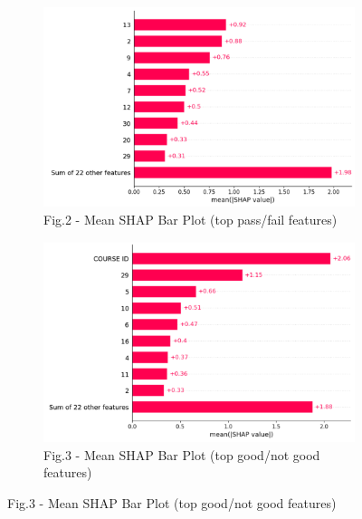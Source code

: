 \begin{figure}[H]
    \centering
    \begin{subfigure}[b]{0.49\textwidth}
        \centering
        \includegraphics[width=\textwidth]{media/ict/image18}
        \caption*{Fig.2 - Mean SHAP Bar Plot (top pass/fail features)}
    \end{subfigure}
    \begin{subfigure}[b]{0.49\textwidth}
        \centering
        \includegraphics[width=\textwidth]{media/ict/image19}
        \caption*{Fig.3 - Mean SHAP Bar Plot (top good/not good features)}
    \end{subfigure}
\end{figure}

